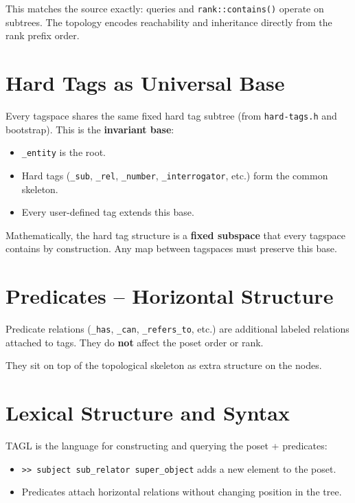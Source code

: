 \documentclass[11pt,a4paper]{article}
\begin{document}
This matches the source exactly: queries and \texttt{rank::contains()} operate on subtrees. The topology encodes reachability and inheritance directly from the rank prefix order.

\section{Hard Tags as Universal Base}

Every tagspace shares the same fixed hard tag subtree (from \texttt{hard-tags.h} and bootstrap). This is the \textbf{invariant base}:

\begin{itemize}
    \item \texttt{\_entity} is the root.
    \item Hard tags (\texttt{\_sub}, \texttt{\_rel}, \texttt{\_number}, \texttt{\_interrogator}, etc.) form the common skeleton.
    \item Every user-defined tag extends this base.
\end{itemize}

Mathematically, the hard tag structure is a \textbf{fixed subspace} that every tagspace contains by construction. Any map between tagspaces must preserve this base.

\section{Predicates -- Horizontal Structure}

Predicate relations (\texttt{\_has}, \texttt{\_can}, \texttt{\_refers\_to}, etc.) are additional labeled relations attached to tags. They do \textbf{not} affect the poset order or rank.

They sit on top of the topological skeleton as extra structure on the nodes.

\section{Lexical Structure and Syntax}

TAGL is the language for constructing and querying the poset + predicates:

\begin{itemize}
    \item \texttt{>> subject sub\_relator super\_object} adds a new element to the poset.
    \item Predicates attach horizontal relations without changing position in the tree.
\end{itemize}
\end{document}
